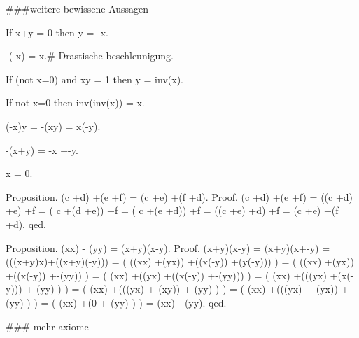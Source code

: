 \documentclass{article}
\newenvironment{forthel}{\begin{leftbar}}{\end{leftbar}}
\newtheorem{axiom}{\begin{axiom} }
\newcommand{\rmul}{\cdot}
\newcommand{\radd}{+}
\begin{document}
\begin{forthel}
###weitere bewissene Aussagen
\begin{axiom}  [P114c] If x\radd y = 0 then y = -x.
\end{axiom}
\begin{axiom}  [P114d] -(-x) = x.# Drastische beschleunigung.
\end{axiom}
\begin{axiom}  [P115c] If (not x=0) and x\rmul y = 1 then y = inv(x).  
\end{axiom}
\begin{axiom}  [P115d] If not x=0 then inv(inv(x)) = x.
\end{axiom}
\begin{axiom} [P116c] (-x)\rmul y = -(x\rmul y) = x\rmul (-y).
\end{axiom}

\begin{axiom} -(x\radd y) = -x \radd  -y. 
\end{axiom}
\begin{axiom} x\rmul 0 = 0. 
\end{axiom}

Proposition. (c \radd  d) \radd  (e  \radd  f) = (c \radd  e) \radd  (f   \radd  d).
Proof. (c \radd  d) \radd  (e  \radd  f)	= ((c \radd   d) \radd   e)  \radd  f 
       	 	   				= ( c \radd  (d  \radd   e)) \radd  f 
       	    				= ( c \radd  (e  \radd   d)) \radd  f 
      						= ((c \radd   e) \radd   d)  \radd  f 
      						=  (c \radd   e) \radd  (f   \radd  d).
qed.

Proposition. (x\rmul x) - (y\rmul y) = (x\radd y)\rmul (x-y).
Proof. (x\radd y)\rmul (x-y) 	= (x\radd y)\rmul (x\radd  -y) = (((x\radd y)\rmul x)\radd  ((x\radd y)\rmul (-y))) = ( ((x\rmul x) \radd  (y\rmul x)) \radd  ((x\rmul (-y)) \radd  (y\rmul (-y))) )
					= ( ((x\rmul x) \radd  (y\rmul x)) \radd  ((x\rmul (-y)) \radd  -(y\rmul y)) )
					= ( (x\rmul x) \radd  ((y\rmul x) \radd  ((x\rmul (-y)) \radd  -(y\rmul y))) )
					= ( (x\rmul x) \radd  (((y\rmul x) \radd  (x\rmul (-y))) \radd  -(y\rmul y) ) )
					= ( (x\rmul x) \radd  (((y\rmul x) \radd  -(x\rmul y)) \radd  -(y\rmul y) ) )
					= ( (x\rmul x) \radd  (((y\rmul x) \radd  -(y\rmul x)) \radd  -(y\rmul y) ) )
					= ( (x\rmul x) \radd  (0 \radd  -(y\rmul y) ) )
					= (x\rmul x) - (y\rmul y).
qed.


### mehr axiome





\end{forthel}
\end{document}
